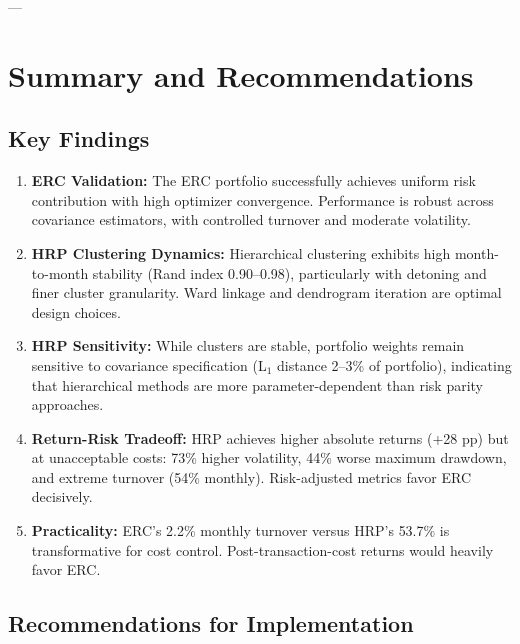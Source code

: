 ---

\section{Summary and Recommendations}

\subsection{Key Findings}

\begin{enumerate}
    \item \textbf{ERC Validation:} The ERC portfolio successfully achieves uniform risk contribution with high optimizer convergence. Performance is robust across covariance estimators, with controlled turnover and moderate volatility.
    
    \item \textbf{HRP Clustering Dynamics:} Hierarchical clustering exhibits high month-to-month stability (Rand index 0.90--0.98), particularly with detoning and finer cluster granularity. Ward linkage and dendrogram iteration are optimal design choices.
    
    \item \textbf{HRP Sensitivity:} While clusters are stable, portfolio weights remain sensitive to covariance specification (L$_1$ distance 2--3\% of portfolio), indicating that hierarchical methods are more parameter-dependent than risk parity approaches.
    
    \item \textbf{Return-Risk Tradeoff:} HRP achieves higher absolute returns (+28 pp) but at unacceptable costs: 73\% higher volatility, 44\% worse maximum drawdown, and extreme turnover (54\% monthly). Risk-adjusted metrics favor ERC decisively.
    
    \item \textbf{Practicality:} ERC's 2.2\% monthly turnover versus HRP's 53.7\% is transformative for cost control. Post-transaction-cost returns would heavily favor ERC.
\end{enumerate}

\subsection{Recommendations for Implementation}

